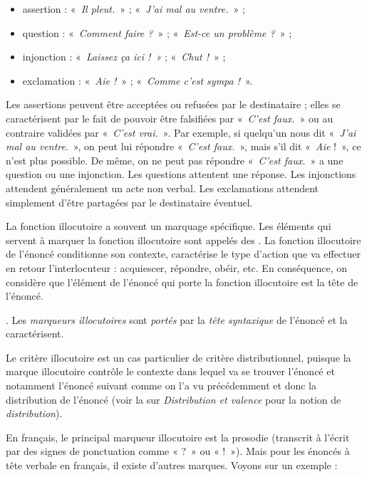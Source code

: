 \begin{itemize}
\item assertion : «~\textit{Il pleut.}~» ; «~\textit{J’ai mal au ventre.}~» ;
\item question : «~\textit{Comment faire ?}~» ; «~\textit{Est-ce un problème ?}~» ;
\item injonction : «~\textit{Laissez ça ici !~»} ; «~\textit{Chut !}~» ;
\item exclamation : «~\textit{Aie !}~» ; «~\textit{Comme c’est sympa !}~».
\end{itemize}

Les assertions peuvent être acceptées ou refusées par le destinataire ; elles se caractérisent par le fait de pouvoir être falsifiées par «~\textit{C’est faux.}~» ou au contraire validées par «~\textit{C’est vrai.}~». Par exemple, si quelqu’un nous dit «~\textit{J’ai mal au ventre}.~», on peut lui répondre «~\textit{C’est faux.}~», mais s’il dit «~\textit{Aie} !~», ce n’est plus possible. De même, on ne peut pas répondre «~\textit{C’est faux.}~» a une question ou une injonction. Les questions attentent une réponse. Les injonctions attendent généralement un acte non verbal. Les exclamations attendent simplement d’être partagées par le destinataire éventuel.

La fonction illocutoire a souvent un marquage spécifique. Les éléments qui servent à marquer la fonction illocutoire sont appelés des . La fonction illocutoire de l'énoncé conditionne son contexte, caractérise le type d'action que va effectuer en retour l'interlocuteur : acquiescer, répondre, obéir, etc. En conséquence, on considère que l'élément de l'énoncé qui porte la fonction illocutoire est la tête de l'énoncé.

{. Les \textit{marqueurs illocutoires} sont \textit{portés} par la \textit{tête syntaxique} de l’énoncé et la caractérisent.}

Le critère illocutoire est un cas particulier de critère distributionnel, puisque la marque illocutoire contrôle le contexte dans lequel va se trouver l'énoncé et notamment l'énoncé suivant comme on l'a vu précédemment et donc la distribution de l'énoncé (voir la  sur \textit{Distribution et valence} pour la notion de \textit{distribution}).

En français, le principal marqueur illocutoire est la prosodie (transcrit à l’écrit par des signes de ponctuation comme « ?~» ou « !~»). Mais pour les énoncés à tête verbale en français, il existe d’autres marques. Voyons sur un exemple :


